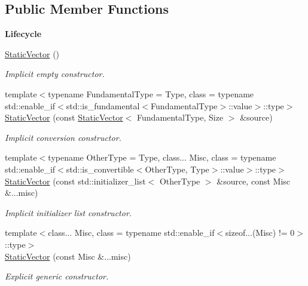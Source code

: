 \subsection*{Public Member Functions}
\begin{Indent}{\bf Lifecycle}\par
\begin{DoxyCompactItemize}
\item 
\hyperlink{exceptionmagrathea_1_1StaticVector_a4f3abad5f9eae82085039fa10e7fa3da}{Static\-Vector} ()
\begin{DoxyCompactList}\small\item\em Implicit empty constructor. \end{DoxyCompactList}\item 
{\footnotesize template$<$typename Fundamental\-Type  = Type, class  = typename std\-::enable\-\_\-if$<$std\-::is\-\_\-fundamental$<$\-Fundamental\-Type$>$\-::value$>$\-::type$>$ }\\\hyperlink{exceptionmagrathea_1_1StaticVector_a9a5d06849def3742579fea2bfe37b63d}{Static\-Vector} (const \hyperlink{exceptionmagrathea_1_1StaticVector}{Static\-Vector}$<$ Fundamental\-Type, Size $>$ \&source)
\begin{DoxyCompactList}\small\item\em Implicit conversion constructor. \end{DoxyCompactList}\item 
{\footnotesize template$<$typename Other\-Type  = Type, class... Misc, class  = typename std\-::enable\-\_\-if$<$std\-::is\-\_\-convertible$<$\-Other\-Type, Type$>$\-::value$>$\-::type$>$ }\\\hyperlink{exceptionmagrathea_1_1StaticVector_a2dcd770d2c1fae3b22e43419deb417e1}{Static\-Vector} (const std\-::initializer\-\_\-list$<$ Other\-Type $>$ \&source, const Misc \&...misc)
\begin{DoxyCompactList}\small\item\em Implicit initializer list constructor. \end{DoxyCompactList}\item 
{\footnotesize template$<$class... Misc, class  = typename std\-::enable\-\_\-if$<$sizeof...(\-Misc) != 0$>$\-::type$>$ }\\\hyperlink{exceptionmagrathea_1_1StaticVector_a4f9267144fc22cd84ee3918439cfd41e}{Static\-Vector} (const Misc \&...misc)
\begin{DoxyCompactList}\small\item\em Explicit generic constructor. \end{DoxyCompactList}\end{DoxyCompactItemize}
\end{Indent}
